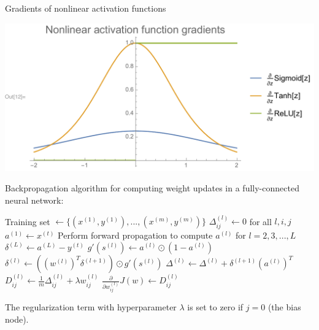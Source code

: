 \documentclass[xetex,compress]{beamer}
\newcommand\Fontsmaller{\fontsize{9pt}{10.0}\selectfont}
\begin{document}
\begin{frame}{Gradients of nonlinear activation functions}
  \begin{center}
    \includegraphics[width=1.00\textwidth]{./figures/nonlinear_activation_gradients.pdf}
  \end{center}
\end{frame}


\begin{frame}{Backpropagation algorithm}
  \Fontsmaller
  for computing weight updates in a fully-connected neural network:
  \begin{algorithmic}[1]
    \State Training set \(\gets \{ (x^{(1)},y^{(1)}), ..., (x^{(m)},y^{(m)}) \}\)
    \State \(\Delta_{ij}^{(l)} \gets 0\) for all \(l,i,j\)
      \State \(a^{(1)} \gets x^{(t)}\)
      \State Perform forward propagation to compute \(a^{(l)}\) for \(l=2,3,...,L\)
      \State \(\delta^{(L)} \gets a^{(L)} - y^{(t)}\)
        \State \( g'(s^{(l)}) \gets a^{(l)} \odot (1 - a^{(l)}) \)
        \State \( \delta^{(l)} \gets ( (w^{(l)})^{T} \delta^{(l+1)} ) \odot g'(s^{(l)}) \)
        \State \( \Delta^{(l)} \gets \Delta^{(l)} + \delta^{(l+1)} (a^{(l)})^{T}  \)
        \State \(D_{ij}^{(l)} \gets \frac{1}{m} \Delta_{ij}^{(l)} + \lambda w_{ij}^{(l)} \)
      \EndFor
    \EndFor
    \State \( \frac{\partial}{\partial w_{ij}^{(l)}} J(w) \gets D_{ij}^{(l)} \)
  \end{algorithmic}
  The regularization term with hyperparameter \(\lambda\) is set to zero if \(j = 0\) (the bias node).
\end{frame}
\end{document}
